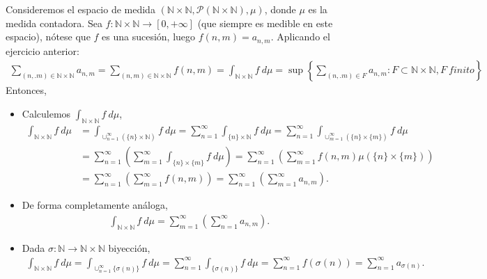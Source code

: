 \begin{ejemplo}
    Consideremos el espacio de medida $(\mathbb{N} \times \mathbb{N}, \mathcal{P}(\mathbb{N} \times \mathbb{N}), \mu)$, donde $\mu$ es la medida contadora. Sea $f: \mathbb{N} \times \mathbb{N} \longrightarrow [0,+\infty]$ (que siempre es medible en este espacio), nótese que $f$ es una sucesión, luego $f(n,m) = a_{n,m}$. Aplicando el ejercicio anterior:
    \begin{align*}
        \sum_{(n,.m) \in \mathbb{N} \times \mathbb{N}}{a_{n,m}} = \sum_{(n,m) \in \mathbb{N} \times \mathbb{N}}{f(n,m)} = \int_{\mathbb{N} \times \mathbb{N}}{f \ d\mu} = \sup{\left\{\sum_{(n,.m) \in F}{a_{n,m}} : F \subset \mathbb{N} \times \mathbb{N}, F \ finito \right\}}
    \end{align*}
    Entonces,
    \begin{itemize}
        \item Calculemos $\int_{\mathbb{N} \times \mathbb{N}}{f \ d\mu}$,
              \begin{align*}
                  \int_{\mathbb{N} \times \mathbb{N}}{f \ d\mu} & = \int_{\cup_{n=1}^{\infty}{(\{n\}\times\mathbb{N})}}{f \ d\mu} = \sum_{n=1}^{\infty}{\int_{\{n\}\times\mathbb{N}}}{f \ d\mu} = \sum_{n=1}^{\infty}{\int_{\cup_{m=1}^{\infty}{(\{n\}\times\{m\})}}}{f \ d\mu} \\
                                                                & = \sum_{n=1}^{\infty}{\left( \sum_{m=1}^{\infty}{\int_{\{n\}\times\{m\}}}{f \ d\mu}\right)} = \sum_{n=1}^{\infty}{\left( \sum_{m=1}^{\infty}{f(n,m)\mu(\{n\}\times\{m\})}\right)}                             \\
                                                                & = \sum_{n=1}^{\infty}{\left( \sum_{m=1}^{\infty}{f(n,m)}\right)} = \sum_{n=1}^{\infty}{\left( \sum_{m=1}^{\infty}{a_{n,m}}\right)}.
              \end{align*}
        \item De forma completamente análoga,
              \begin{align*}
                  \int_{\mathbb{N} \times \mathbb{N}}{f \ d\mu} = \sum_{m=1}^{\infty}{\left( \sum_{n=1}^{\infty}{a_{n,m}}\right)}.
              \end{align*}
        \item Dada $\sigma: \mathbb{N} \longrightarrow \mathbb{N} \times \mathbb{N}$ biyección,
              \begin{align*}
                  \int_{\mathbb{N} \times \mathbb{N}}{f \ d\mu} = \int_{\cup_{n=1}^{\infty}{\{\sigma(n)\}}}{f \ d\mu} = \sum_{n=1}^{\infty}{\int_{\{\sigma(n)\}}}{f \ d\mu} = \sum_{n=1}^{\infty}{f(\sigma(n))} = \sum_{n=1}^{\infty}{a_{\sigma(n)}}.
              \end{align*}
    \end{itemize}
\end{ejemplo}

